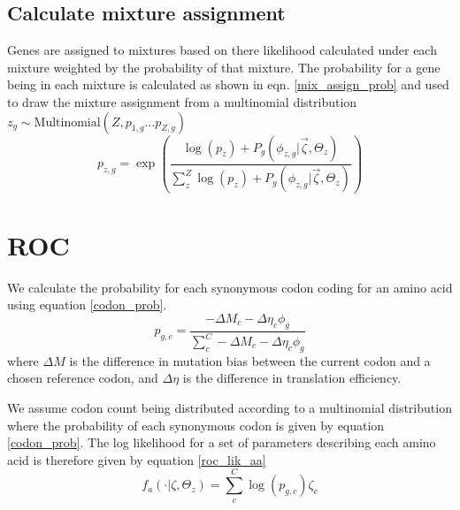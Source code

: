 \documentclass[11pt]{article}
\begin{document}
  \subsection{Calculate mixture assignment}
  Genes are assigned to mixtures based on there likelihood calculated under each mixture weighted by the probability of that mixture.
  The probability for a gene being in each mixture is calculated as shown in eqn. \ref{mix_assign_prob} and used to draw the mixture assignment from a multinomial distribution $z_g \sim \text{Multinomial}(Z, p_{1,g} \ldots p_{Z,g})$  
  \begin{equation}
    p_{z,g} = \exp \left(\frac{\log(p_z) + P_g(\phi_{z,g}|\vec{\zeta}, \Theta_z)}{\sum_z^Z \log(p_z) + P_g(\phi_{z,g}|\vec{\zeta}, \Theta_z)}\right)
    \label{mix_assign_prob}
  \end{equation}

  
  \section{ROC}
  
  We calculate the probability for each synonymous codon coding for an amino acid using equation \ref{codon_prob}.
  \begin{equation}
    p_{g,c} = \frac{-\Delta M_c - \Delta\eta_c \phi_g}{\sum_c^C -\Delta M_c - \Delta\eta_c \phi_g}
    \label{codon_prob}
  \end{equation}
  where $\Delta M$ is the difference in mutation bias between the current codon and a chosen reference codon, and $\Delta \eta$ is the difference in
  translation efficiency. 
  
  We assume codon count being distributed according to a multinomial distribution where the probability of each synonymous codon is given by equation \ref{codon_prob}.
  The log likelihood for a set of parameters describing each amino acid is therefore given by equation \ref{roc_lik_aa}
  \begin{equation}
    f_a(\cdot|\zeta, \Theta_z) = \sum_c^C \log(p_{g,c}) \zeta_c
    \label{roc_lik_aa}
  \end{equation}
  
\end{document}
